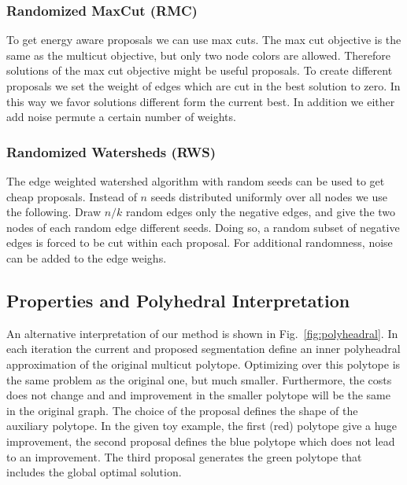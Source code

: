 \documentclass[10pt,twocolumn,letterpaper]{article}
\begin{document}
\subsubsection{Randomized MaxCut  (RMC)}

To get energy aware proposals we can use max cuts.
The max cut objective is the same as
the multicut objective, but only two 
node colors are allowed.
Therefore solutions of the max cut objective
might be useful proposals.
To create different proposals we set 
the weight of edges which are cut 
in the best solution to zero.
In this way we favor solutions 
different form the current best. 
In addition we either add noise permute a certain number of weights.


\subsubsection{Randomized Watersheds (RWS)}

The edge weighted watershed algorithm \cite{meyer_2013}
with random seeds can be used to get 
cheap proposals. Instead of $n$ seeds distributed uniformly
over all nodes we use the following.
Draw $n/k$ random edges only the negative edges, 
and give the two nodes of each random edge different seeds.
Doing so, a random subset of negative edges is forced
to be cut within each proposal.
For additional randomness, noise can be added to
the edge weighs.





\subsection{Properties and Polyhedral Interpretation}
An alternative interpretation of our method is shown in Fig.~\ref{fig:polyheadral}.
In each iteration the current and proposed segmentation define an inner polyheadral 
approximation of the original multicut polytope. 
Optimizing over this polytope is the same problem as the original one, but much smaller.
Furthermore, the costs does not change and and improvement in the smaller polytope will 
be the same in the original graph.
The choice of the proposal defines the shape of the auxiliary polytope. 
In the given toy example, the first (red) polytope give a huge improvement, the second proposal
defines the blue polytope which does not lead to an improvement. 
The third proposal generates the green polytope that includes the global optimal solution.
\end{document}
